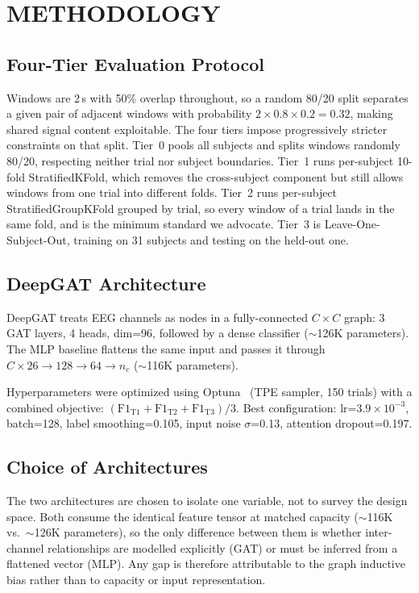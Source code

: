 \documentclass[conference,a4paper]{IEEEtran}
\begin{document}
\section{METHODOLOGY}

\subsection{Four-Tier Evaluation Protocol}

Windows are 2\,s with 50\% overlap throughout, so a random 80/20 split separates a given pair of adjacent windows with probability $2 \times 0.8 \times 0.2 = 0.32$, making shared signal content exploitable. The four tiers impose progressively stricter constraints on that split. Tier~0 pools all subjects and splits windows randomly 80/20, respecting neither trial nor subject boundaries. Tier~1 runs per-subject 10-fold StratifiedKFold, which removes the cross-subject component but still allows windows from one trial into different folds. Tier~2 runs per-subject StratifiedGroupKFold grouped by trial, so every window of a trial lands in the same fold, and is the minimum standard we advocate. Tier~3 is Leave-One-Subject-Out, training on 31 subjects and testing on the held-out one.

\subsection{DeepGAT Architecture}

DeepGAT treats EEG channels as nodes in a fully-connected $C{\times}C$ graph: 3 GAT layers, 4 heads, dim=96, followed by a dense classifier ($\sim$126K parameters). The MLP baseline flattens the same input and passes it through $C{\times}26 \to 128 \to 64 \to n_c$ ($\sim$116K parameters).

Hyperparameters were optimized using Optuna~\cite{akiba2019} (TPE sampler, 150 trials) with a combined objective: $(\text{F1}_{\text{T1}} + \text{F1}_{\text{T2}} + \text{F1}_{\text{T3}})/3$. Best configuration: lr=$3.9{\times}10^{-3}$, batch=128, label smoothing=0.105, input noise $\sigma$=0.13, attention dropout=0.197.

\subsection{Choice of Architectures}
\label{sec:archchoice}

The two architectures are chosen to isolate one variable, not to survey the design space. Both consume the identical feature tensor at matched capacity ($\sim$116K vs.\ $\sim$126K parameters), so the only difference between them is whether inter-channel relationships are modelled explicitly (GAT) or must be inferred from a flattened vector (MLP). Any gap is therefore attributable to the graph inductive bias rather than to capacity or input representation.
\end{document}
